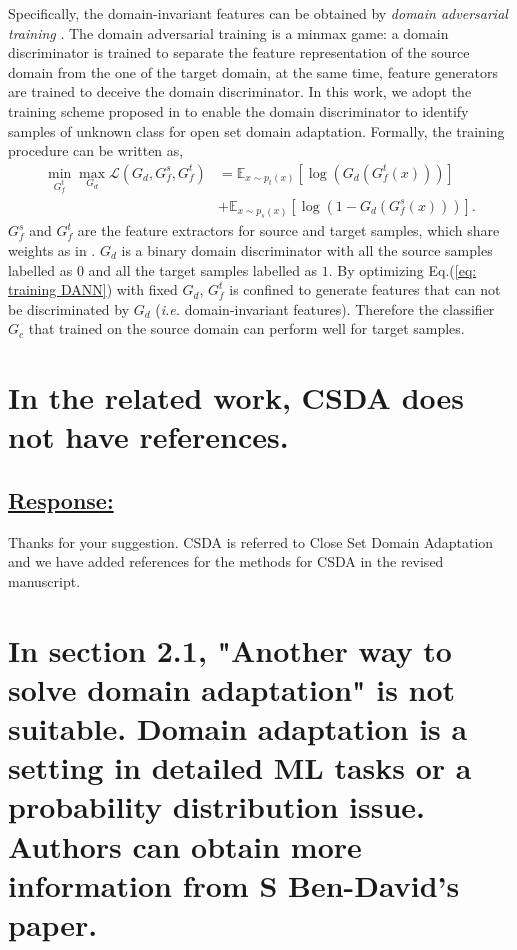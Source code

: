 Specifically, the domain-invariant features can be obtained by \textit{domain adversarial training} \cite{DomainAdversrialNetwork,ADDA,OpensetDA-bp}.
The domain adversarial training is a minmax game: a domain discriminator is trained to separate the feature representation of the source domain from the one of the target domain, at the same time, feature generators are trained to deceive the domain discriminator.
In this work, we adopt the training scheme proposed in \cite{OpensetDA-bp} to enable the domain discriminator to identify samples of unknown class for open set domain adaptation.
Formally, the training procedure can be written as,
\begin{equation}
    \label{eq: training DANN}
    \begin{split}
        \min_{G_f^t} \max_{G_d} \mathscr{L}(G_d,G^{s}_{f},G_f^t) &=\mathbb{E}_{x\sim p_t(x)} \left[ \log \left(G_d\left(G_f^t\left(x\right)\right)\right) \right]\\
        &+\mathbb{E}_{x\sim p_s(x)}\left[ \log \left(1-G_d\left(G_f^s\left(x\right)\right)\right) \right].
    \end{split}
\end{equation}
$G_f^s$ and $G_f^t$ are the feature extractors for source and target samples, which share weights as in \cite{OpensetDA-bp}.
$G_d$ is a binary domain discriminator with all the source samples labelled as $0$ and all the target samples labelled as $1$.
By optimizing Eq.(\ref{eq: training DANN}) with fixed $G_d$, $G_f^t$ is confined to generate features that can not be discriminated by $G_d$ (\textit{i.e.} domain-invariant features).
Therefore the classifier $G_c$ that trained on the source domain can perform well for target samples.

\section{In the related work, CSDA does not have references.}
\subsection*{\underline{\textbf{Response:}}}
Thanks for your suggestion.
CSDA is referred to Close Set Domain Adaptation and we have added references \cite{ben2010theory,Elsevier-DeepVisualDA,TransferLearningSurvey} for the methods for CSDA in the revised manuscript.

\section{In section 2.1, "Another way to solve domain adaptation" is not suitable.
Domain adaptation is a setting in detailed ML tasks or a probability distribution issue.
Authors can obtain more information from S Ben-David's paper.}
